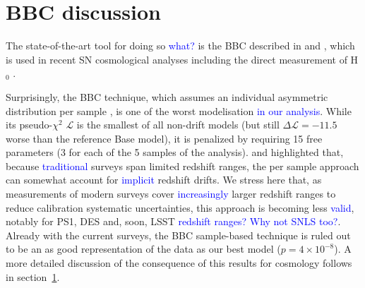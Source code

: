 \documentclass[]{aa} %
\newcommand{\mr}[1]{{\textcolor[rgb]{0.60,0.10,0.6}{#1}}}
\newcommand{\nn}[1]{{\textcolor[rgb]{1, 0.27, 0}{#1}}}
\newcommand{\yc}[1]{{\textcolor{blue}{#1}}}
\begin{document}
\section{\nn{BBC discussion}}
\label{sec:bbc}

\mr{The state-of-the-art tool for doing so \yc{what?} is the BBC described in
    \cite{scolnic2016} and \cite{kessler2017}, which is used in recent SN
    cosmological analyses \citep{jones2018b, scolnic2018a, brout2019,
    descosmopaper2019} including the direct measurement of H$_0$
\citep{riess2016,riess2019}.}

\mr{Surprisingly, the BBC technique, which assumes an individual asymmetric
    distribution per sample \citep{scolnic2016,kessler2017}, is one of the worst
    modelisation \yc{in our analysis}. While its pseudo-$\chi^{2}$ $\mathcal{L}$ is the smallest of all
    non-drift models (but still $\Delta \mathcal{L}=-11.5$ worse than the
    reference Base model), it is penalized by requiring 15 free parameters (3 for each of the 5 samples of the analysis).
    \citet[][section~2]{scolnic2016} and \citet[][section~5.4]{scolnic2018a}
    highlighted that, because \yc{traditional} surveys span limited redshift ranges, the
    per sample approach can somewhat account for \yc{implicit} redshift drifts. We
    stress here that, as measurements of modern surveys cover \yc{increasingly} larger redshift
    ranges to reduce calibration systematic  uncertainties, this approach is becoming
    less \yc{valid}, notably for PS1, DES and, soon, LSST \yc{redshift ranges? Why not SNLS too?}. Already with the current
    surveys, the BBC sample-based technique is \nn{ruled out} to be an as good
    representation of the data as our best model ($p=4\times 10^{-8}$). A more
    detailed discussion of the consequence of this results for cosmology follows
in section~\ref{sec:bbc}.}
\end{document}
